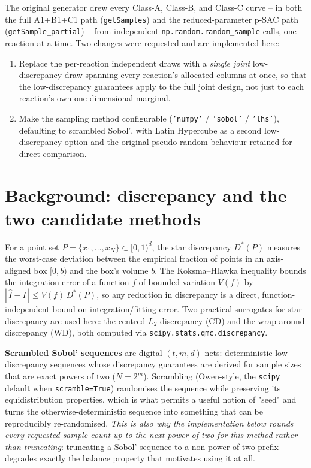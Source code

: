 \documentclass[11pt]{article}
\newcommand{\code}[1]{\texttt{#1}}
\begin{document}
The original generator drew every Class-A, Class-B, and Class-C curve -- in both the full A1+B1+C1 path (\code{getSamples}) and the reduced-parameter p-SAC path (\code{getSample\_partial}) -- from independent \code{np.random.random\_sample} calls, one reaction at a time. Two changes were requested and are implemented here:

\begin{enumerate}
  \item Replace the per-reaction independent draws with a \emph{single joint} low-discrepancy draw spanning every reaction's allocated columns at once, so that the low-discrepancy guarantees apply to the full joint design, not just to each reaction's own one-dimensional marginal.
  \item Make the sampling method configurable (\code{'numpy'} / \code{'sobol'} / \code{'lhs'}), defaulting to scrambled Sobol', with Latin Hypercube as a second low-discrepancy option and the original pseudo-random behaviour retained for direct comparison.
\end{enumerate}

\section{Background: discrepancy and the two candidate methods}

For a point set $P = \{x_1,\dots,x_N\} \subset [0,1)^d$, the star discrepancy $D^*(P)$ measures the worst-case deviation between the empirical fraction of points in an axis-aligned box $[0,b)$ and the box's volume $b$. The Koksma--Hlawka inequality bounds the integration error of a function $f$ of bounded variation $V(f)$ by $|\,\hat I - I\,| \le V(f)\, D^*(P)$, so any reduction in discrepancy is a direct, function-independent bound on integration/fitting error. Two practical surrogates for star discrepancy are used here: the centred $L_2$ discrepancy (CD) and the wrap-around discrepancy (WD), both computed via \code{scipy.stats.qmc.discrepancy}.

\textbf{Scrambled Sobol' sequences} are digital $(t,m,d)$-nets: deterministic low-discrepancy sequences whose discrepancy guarantees are derived for sample sizes that are exact powers of two ($N = 2^m$). Scrambling (Owen-style, the \code{scipy} default when \code{scramble=True}) randomises the sequence while preserving its equidistribution properties, which is what permits a useful notion of "seed" and turns the otherwise-deterministic sequence into something that can be reproducibly re-randomised. \emph{This is also why the implementation below rounds every requested sample count up to the next power of two for this method rather than truncating}: truncating a Sobol' sequence to a non-power-of-two prefix degrades exactly the balance property that motivates using it at all.
\end{document}
